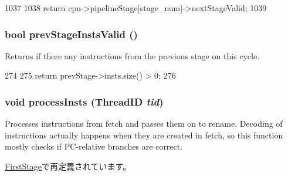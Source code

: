 \begin{DoxyCode}
1037 {
1038     return cpu->pipelineStage[stage_num]->nextStageValid;
1039 }
\end{DoxyCode}
\hypertarget{classPipelineStage_ab03996f3423928a0e84dc3df7fd493f2}{
\subsubsection[{prevStageInstsValid}]{\setlength{\rightskip}{0pt plus 5cm}bool prevStageInstsValid ()}}
\label{classPipelineStage_ab03996f3423928a0e84dc3df7fd493f2}
Returns if there any instructions from the previous stage on this cycle. 


\begin{DoxyCode}
274 {
275     return prevStage->insts.size() > 0;
276 }
\end{DoxyCode}
\hypertarget{classPipelineStage_a4120d7c6b83eb82877f4d21109c105ba}{
\subsubsection[{processInsts}]{\setlength{\rightskip}{0pt plus 5cm}void processInsts ({\bf ThreadID} {\em tid})}}
\label{classPipelineStage_a4120d7c6b83eb82877f4d21109c105ba}
Processes instructions from fetch and passes them on to rename. Decoding of instructions actually happens when they are created in fetch, so this function mostly checks if PC-\/relative branches are correct. 

\hyperlink{classFirstStage_a4120d7c6b83eb82877f4d21109c105ba}{FirstStage}で再定義されています。



